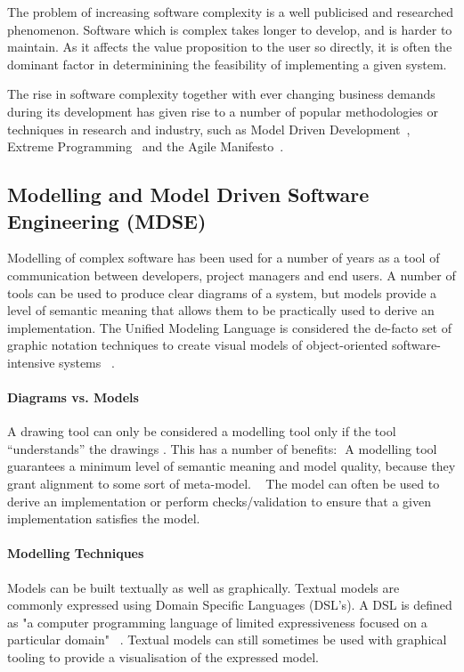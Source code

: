 \documentclass{cshonours}
\begin{document}
The problem of increasing software complexity is a well publicised and researched phenomenon. Software which is complex takes longer to develop, and is harder to maintain. As it affects the value proposition to the user so directly, it is often the dominant factor in determinining the feasibility of implementing a given system.

The rise in software complexity together with ever changing business demands during its development has given rise to a number of popular methodologies or techniques in research and industry, such as Model Driven Development~\cite{MDD}, Extreme Programming~\cite{BeckXP} and the Agile Manifesto~\cite{AgileManifesto}.

\subsection{Modelling and Model Driven Software Engineering (MDSE)}

Modelling of complex software has been used for a number of years as a tool of communication between developers, project managers and end users. A number of tools can be used to produce clear diagrams of a system, but models provide a level of semantic meaning that allows them to be practically used to derive an implementation. The Unified Modeling Language is considered the de-facto set of graphic notation techniques to create visual models of object-oriented software-intensive systems ~\cite{UMLDefinition}.

\paragraph{Diagrams vs. Models}
A drawing tool can only be considered a modelling tool only if the tool “understands” the drawings \cite[p.~11]{ModelDrivenDevelopment}. This has a number of benefits: 
A modelling tool guarantees a minimum level of semantic meaning and model quality, because they grant alignment to some sort of meta-model. ~\cite[p.~12]{ModelDrivenDevelopment}
The model can often be used to derive an implementation or perform checks/validation to ensure that a given implementation satisfies the model. 

\paragraph{Modelling Techniques}
Models can be built textually as well as graphically. Textual models are commonly expressed using Domain Specific Languages (DSL’s). A DSL is defined as "a computer programming language of limited expressiveness focused on a particular domain" ~\cite{FowlerDSL}. Textual models can still sometimes be used with graphical tooling to provide a visualisation of the expressed model.
\end{document}
